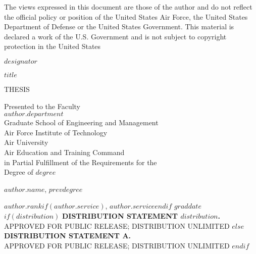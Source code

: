 \documentclass[12pt,letterpaper,toc=flat,oneside]{report}
\begin{document}
	\thispagestyle{empty}
	\singlespacing
	\null	
	\vfill 
	\noindent The views expressed in this document are those of the
author and do not reflect the official policy or position of the
United States Air Force, the United States Department of Defense or
the United States Government.  This material is declared a work of the
U.S. Government and is not subject to copyright protection in the
United States
	\vfill 
	\doublespacing
	\newpage
	\pagestyle{plain}
    \begin{titlepage}
	\thispagestyle{empty}
	\noindent $designator$  
	\vfill
	\begin{center}
	    \MakeUppercase{$title$}\par
	    \vskip 1cm
	    \MakeUppercase{thesis}\par
	    \vskip 1cm
	    Presented to the Faculty\\
	    $author.department$\\
	    Graduate School of Engineering and Management~\\
	    Air Force Institute of Technology~\\
	    Air University~\\
	    Air Education and Training Command~\\
	    in Partial Fulfillment of the Requirements for the~\\
	    Degree of $degree$\\
	    \vskip 1cm
	    {$author.name$, $prevdegree$\par}
	    {$author.rank$$if(author.service)$, \MakeUppercase{$author.service$}$endif$}
	    \vskip 1cm
	    $graddate$
	    \vskip 1cm
	    $if(distribution)$
	    \MakeUppercase{\textbf{distribution statement $distribution$.}}\\[-8pt]
	    \MakeUppercase{approved for public release; distribution unlimited}
	    $else$
	    \MakeUppercase{\textbf{distribution statement a.}}\\[-8pt]
	    \MakeUppercase{Approved for Public Release; distribution unlimited}
	    $endif$	    
	    \vfill
	\end{center}
	\newpage 
	\pagestyle{plain}
    \end{titlepage}
\end{document}
